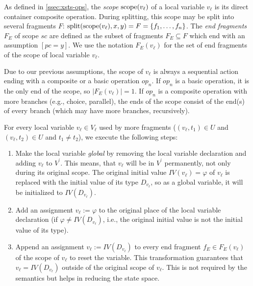 \begin{definition}
    As defined in \autoref{ssec:xsts-ops}, the \emph{scope} $\mathrm{scope}(v_\ell)$ of a local variable $v_\ell$ is its direct container composite operation. During splitting, this scope may be split into several fragments $F$: $\mathrm{split}(\mathrm{scope}(v_\ell), x, y) = F = \{ f_1, \ldots, f_n \}$. The \emph{end fragments} $F_E$ of scope $sc$ are defined as the subset of fragments $F_E \subseteq F$ which end with an assumption $[pc = y]$. We use the notation $F_E(v_\ell)$ for the set of end fragments of the scope of local variable $v_\ell$.

    Due to our previous assumptions, the scope of $v_\ell$ is always a sequential action ending with a composite or a basic operation $op_n$. If $op_n$ is a basic operation, it is the only end of the scope, so $|F_E(v_\ell)| = 1$. If $op_n$ is a composite operation with more branches (e.g., choice, parallel), the ends of the scope consist of the end(s) of every branch (which may have more branches, recursively).
\end{definition}

For every local variable $v_\ell \in V_\ell$ used by more fragments ($(v_\ell, t_1) \in U$ and $(v_\ell, t_2) \in U$ and $t_1 \neq t_2$), we execute the following steps:
\begin{enumerate}
    \item Make the local variable \textit{global} by removing the local variable declaration and adding $v_\ell$ to $V^\prime$. This means, that $v_\ell$ will be in $V^\prime$ permanently, not only during its original scope.
    The original initial value $IV(v_\ell) = \varphi$ of $v_\ell$ is replaced with the initial value of its type $D_{v_\ell}$, so as a global variable, it will be initialized to $IV(D_{v_\ell})$.
    \item Add an assignment $v_\ell := \varphi$ to the original place of the local variable declaration (if $\varphi \neq IV(D_{v_\ell})$, i.e., the original initial value is not the initial value of its type).
    \item Append an assignment $v_\ell := IV(D_{v_\ell})$ to every end fragment $f_E \in F_E(v_\ell)$ of the scope of $v_\ell$ to reset the variable. 
    This transformation guarantees that $v_\ell = IV(D_{v_\ell})$ outside of the original scope of $v_\ell$. This is not required by the semantics but helps in reducing the state space.
\end{enumerate}

